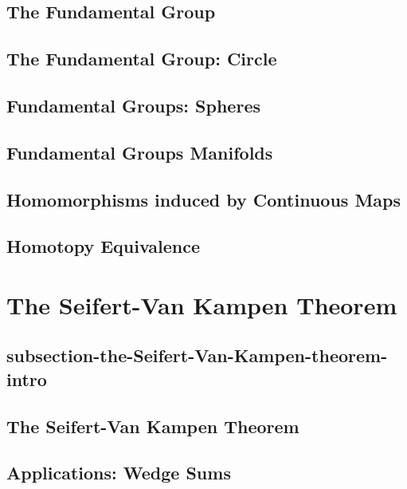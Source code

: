 \subsection{The Fundamental Group}
\label{subsection-the-fundamental-group}

\subsection{The Fundamental Group: Circle}
\label{subsection-the-fundamental-group:-circle}

\subsection{Fundamental Groups: Spheres}
\label{subsection-fundamental-groups-spheres}

\subsection{Fundamental Groups Manifolds}
\label{subsection-fundamental-groups-manifolds}

\subsection{Homomorphisms induced by Continuous Maps}
\label{subsection-homomorphisms-induced-by-continuous-maps}

\subsection{Homotopy Equivalence}
\label{subsection-homotopy-equivalence}

\section{The Seifert-Van Kampen Theorem}
\label{section-the-Seifert-Van-Kampen-theorem}

\label{Intro}
\subsection{subsection-the-Seifert-Van-Kampen-theorem-intro}

\subsection{The Seifert-Van Kampen Theorem}
\label{subsection-the-Seifert-Van-Kampen-theorem}

\subsection{Applications: Wedge Sums}
\label{subsection-applications-wedge-sums}

